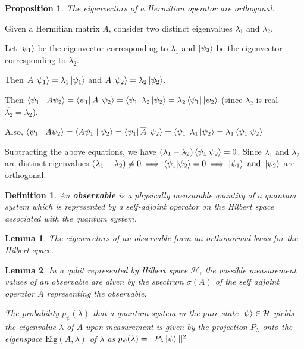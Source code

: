 \documentclass[12pt,twoside,fleqn]{report}
\makeatletter
\theoremstyle{thmstyle}
\renewenvironment{proof}[1][\proofname]{\par
\pushQED{\qed}%
\normalfont \topsep6\p@\@plus6\p@\relax
\trivlist
\item[\hskip\labelsep\itshape#1\@addpunct{.}]\mbox{}\par\nobreak\ignorespaces
}{%
    \popQED\endtrivlist\@endpefalse
    }
\newtheorem{defn}{Definition}[chapter]
\newtheorem{lemma}{Lemma}[chapter]
\newtheorem{prop}{Proposition}[chapter]
\makeatother
\begin{document}
\begin{prop}
    The eigenvectors of a Hermitian operator are orthogonal.
\end{prop}
\begin{proof}
    Given a Hermitian matrix $A$, consider two distinct eigenvalues $\lambda_1$ and $\lambda_2$.

    Let $\ket{\psi_1}$ be the eigenvector corresponding to $\lambda_1$ and $\ket{\psi_2}$ be the eigenvector corresponding to $\lambda_2$.

    Then $A \ket{\psi_1} = \lambda_1 \ket{\psi_1}$ and  $A \ket{\psi_2} = \lambda_2 \ket{\psi_2}$.

    Then $\braket{\psi_1 \; | \; A \psi_2} = \bra{\psi_1} A \ket{ \psi_2} = \bra{\psi_1} \lambda_2 \ket{\psi_2} = \lambda_2 \bra{\psi_1} \ket{\psi_2}$ (since $\lambda_2$ is real $\overline{\lambda_2} = \lambda_2$).
    
    Also, $\braket{\psi_1 \; | \; A \psi_2} = \braket{A \psi_1 \; | \; \psi_2} = \bra{\psi_1} \overline{A} \ket{\psi_2} = \bra{\psi_1} \lambda_1 \ket{\psi_2} = \lambda_1 \braket{\psi_1|\psi_2}$
    

    Subtracting the above equations, we have $(\lambda_1 - \lambda_2) \braket{\psi_1|\psi_2} = 0$.
    Since $\lambda_1$ and $\lambda_2$ are distinct eigenvalues $(\lambda_1 - \lambda_2) \neq 0 \implies \braket{\psi_1|\psi_2} = 0 \implies \ket{\psi_1} \text{ and } \ket{\psi_2} $ are orthogonal.

\end{proof}

\begin{defn}
    An \textbf{observable} is a physically measurable quantity of a quantum system which is represented by a self-adjoint operator on the Hilbert space associated with the quantum system.
\end{defn}

\begin{lemma}
    The eigenvectors of an observable form an orthonormal basis for the Hilbert space.
\end{lemma}

\begin{lemma}
    In a qubit represented by Hilbert space $\mathcal{H}$, the possible measurement values of an observable are given by the spectrum $\sigma(A)$ of the self adjoint operator $A$ representing the observable.

    The probability $p_\psi(\lambda)$ that a quantum system in the pure state $\ket{\psi} \in \mathcal{H}$ yields the eigenvalue $\lambda$ of $A$ upon measurement is given by the projection $P_\lambda$ onto the eigenspace $\text{Eig}(A, \lambda)$ of $\lambda$ as $p_\psi(\lambda) = || P_\lambda \ket{\psi} ||^2$
\end{lemma}
\end{document}
